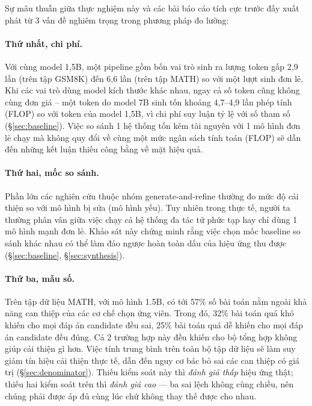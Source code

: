 \documentclass[11pt,a4paper]{article}
\begin{document}
Sự mâu thuẫn giữa thực nghiệm này và các bài báo cáo tích cực trước đấy xuất phát từ 3 vấn đề nghiêm trọng trong phương pháp đo lường:

\paragraph{Thứ nhất, chi phí.} Với cùng model 1,5B, một pipeline gồm bốn vai trò sinh ra lượng token gấp 2,9 lần (trên tập GSM8K) đến
6,6 lần (trên tập MATH) so với một lượt sinh đơn lẻ. Khi các vai trò dùng model kích thước khác nhau, ngay cả số token cũng
không cùng đơn giá -- một token do model 7B sinh tốn khoảng 4,7--4,9 lần phép tính (FLOP) so
với token của model 1,5B, vì chi phí suy luận tỷ lệ với số tham số \cite{kaplan2020}
(\S\ref{sec:baseline}). Việc so sánh 1 hệ thống tốn kém tài nguyên với 1 mô hình đơn lẻ chạy mà không quy đổi về cùng một mức ngân sách tính toán (FLOP) sẽ dẫn đến những kết luận thiếu công bằng về mặt hiệu quả.

\paragraph{Thứ hai, mốc so sánh.} Phần lớn các nghiên cứu thuộc nhóm generate-and-refine thường đo mức độ cải thiện so với mô hình bị sửa (mô hình yếu). Tuy nhiên trong thực tế, người ta thường phân vân giữa việc chạy cả hệ thống đa tác tử phức tạp hay chỉ dùng 1 mô hình mạnh đơn lẻ. Khảo sát này chứng minh rằng việc chọn mốc baseline so sánh khác nhau có thể làm đảo ngược hoàn toàn dấu của hiệu ứng thu được (\S\ref{sec:baseline},
\S\ref{sec:synthesis}).

\paragraph{Thứ ba, mẫu số.} Trên tập dữ liệu MATH, với mô hình 1.5B, có tới 57\% số bài toán nằm ngoài khả năng can thiệp của các cơ chế chọn ứng viên. Trong đó, 32\% bài toán quá khó khiến cho mọi đáp án candidate đều sai, 25\% bài toán quá dễ khiến cho mọi đáp án candidate đều đúng. Cả 2 trường hợp này đều khiến cho bộ tổng hợp không giúp cải thiện gì hơn. Việc tính trung bình trên toàn bộ tập dữ liệu sẽ làm suy giảm tín hiệu cải thiện thực tế, dẫn đến nguy cơ bác bỏ sai các can thiệp có giá trị (\S\ref{sec:denominator}). Thiếu kiểm soát này thì \emph{đánh giá thấp} hiệu ứng thật; thiếu hai kiểm soát trên thì \emph{đánh giá cao} --- ba sai lệch không cùng chiều, nên chúng phải được áp đủ cùng lúc chứ không thay thế được cho nhau.
\end{document}
